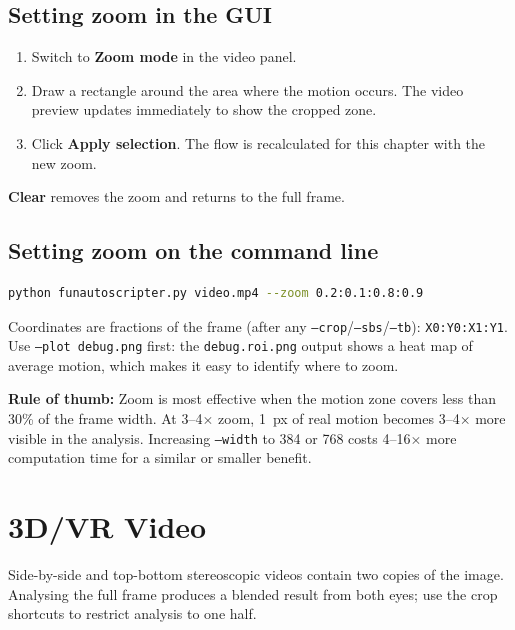\documentclass[11pt,a4paper]{article}
\newcommand{\code}[1]{\texttt{#1}}
\begin{document}
\subsection{Setting zoom in the GUI}

\begin{enumerate}[noitemsep]
  \item Switch to \textbf{Zoom mode} in the video panel.
  \item Draw a rectangle around the area where the motion occurs. The video preview updates immediately to show the cropped zone.
  \item Click \textbf{Apply selection}. The flow is recalculated for this chapter with the new zoom.
\end{enumerate}

\textbf{Clear} removes the zoom and returns to the full frame.

\subsection{Setting zoom on the command line}

\begin{lstlisting}[language=bash]
python funautoscripter.py video.mp4 --zoom 0.2:0.1:0.8:0.9
\end{lstlisting}

Coordinates are fractions of the frame (after any \code{--crop}/\code{--sbs}/\code{--tb}): \code{X0:Y0:X1:Y1}. Use \code{--plot debug.png} first: the \code{debug.roi.png} output shows a heat map of average motion, which makes it easy to identify where to zoom.

\begin{tipbox}
\textbf{Rule of thumb:} Zoom is most effective when the motion zone covers less than 30\% of the frame width. At 3--4$\times$ zoom, 1~px of real motion becomes 3--4$\times$ more visible in the analysis. Increasing \code{--width} to 384 or 768 costs 4--16$\times$ more computation time for a similar or smaller benefit.
\end{tipbox}

\section{3D/VR Video}
\label{sec:vr}

Side-by-side and top-bottom stereoscopic videos contain two copies of the image. Analysing the full frame produces a blended result from both eyes; use the crop shortcuts to restrict analysis to one half.
\end{document}
